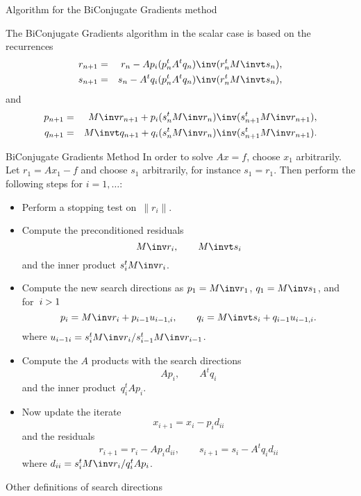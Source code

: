 \documentclass[11pt]{artikel3}
\begin{document}
\begin{Outline}
 {Algorithm for the BiConjugate Gradients method}

The BiConjugate Gradients algorithm in the scalar case
is based on the recurrences
\begin{eqnarray*}
    r_{n+1}&=&r_n-Ap_i(p_n^tA^tq_n)\inv (r_n^tM\invt s_n),\\
    s_{n+1}&=&s_n-A^tq_i(p_n^tA^tq_n)\inv (r_n^tM\invt s_n),
\end{eqnarray*}
and
\begin{eqnarray*}
    p_{n+1}&=&M\inv r_{n+1}+p_i(s_n^tM\inv r_n)\inv (s_{n+1}^tM\inv r_{n+1}),\\
    q_{n+1}&=&M\invt q_{n+1}+q_i(s_n^tM\inv r_n)\inv (s_{n+1}^tM\inv r_{n+1}).
\end{eqnarray*}

\begin{algorithm}{BiConjugate Gradients Method}
In order to solve $Ax=f$, choose $x_1$ arbitrarily.
Let $r_1=Ax_1-f$ and choose $s_1$ arbitrarily, for instance $s_1=r_1$. 
Then perform the following steps for $i=1,\ldots$:
\begin{itemize}
\item Perform a stopping test on~$\|r_i\|$.
\item Compute the preconditioned residuals
\[ M\inv r_i,\qquad M\invt s_i \]
and the inner product $s_i^tM\inv r_i$.
\item Compute the new search directions as $p_1=M\inv r_1$, 
$q_1=M\inv s_1$, and for~$i>\nobreak 1$
\[ p_i=M\inv r_i+p_{i-1}u_{i-1,i},\qquad 
   q_i=M\invt s_i+q_{i-1}u_{i-1,i}. \]
where $u_{i-1i}=s_i^tM\inv r_i/s_{i-1}^tM\inv r_{i-1}$.
\item Compute the $A$ products with the search directions
\[ Ap_i,\qquad A^tq_i \]
and the inner product~$q_i^tAp_i$.
\item Now update the iterate
\[ x_{i+1}=x_i-p_id_{ii} \]
and the residuals
\[ r_{i+1}=r_i-Ap_id_{ii},\qquad s_{i+1}=s_i-A^tq_id_{ii} \]
where $d_{ii}=s_i^tM\inv r_i/q_i^tAp_i$.
\end{itemize}
\end{algorithm}

 {Other definitions of search directions}
\label{sec:alternative-search}


\end{Outline}
\end{document}
